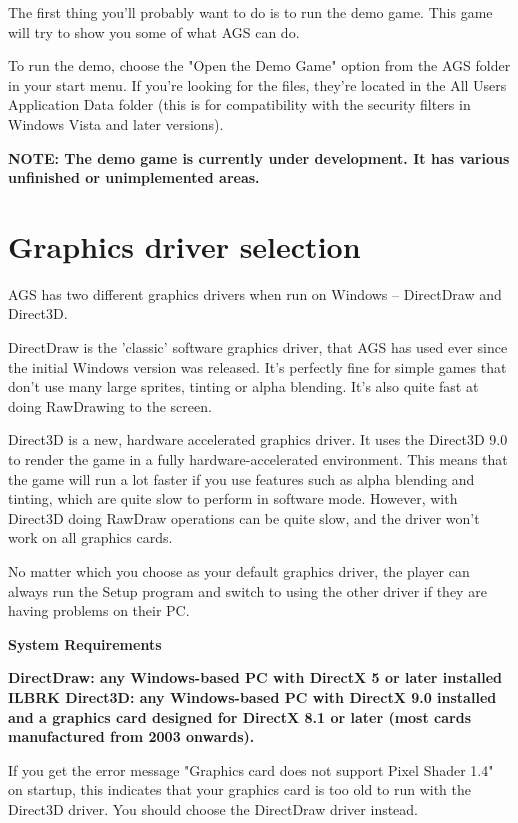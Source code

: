 The first thing you'll probably want to do is to run the demo game. This
game will try to show you some of what AGS can do.

To run the demo, choose the "Open the Demo Game" option from the AGS folder
in your start menu. If you're looking for the files, they're located in the
All Users Application Data folder (this is for compatibility with the security filters in Windows Vista and later versions).

\bf{NOTE:} The demo game is currently under development. It has various unfinished
or unimplemented areas.



\section{Graphics driver selection}\label{GraphicsDriver}%

AGS has two different graphics drivers when run on Windows -- DirectDraw and Direct3D.

DirectDraw is the 'classic' software graphics driver, that AGS has used ever since
the initial Windows version was released. It's perfectly fine for simple games
that don't use many large sprites, tinting or alpha blending. It's also quite fast
at doing RawDrawing to the screen.

Direct3D is a new, hardware accelerated graphics driver. It uses the Direct3D 9.0 to
render the game in a fully hardware-accelerated environment. This means that the
game will run a lot faster if you use features such as alpha blending and tinting,
which are quite slow to perform in software mode. However, with Direct3D doing RawDraw
operations can be quite slow, and the driver won't work on all graphics cards.

No matter which you choose as your default graphics driver, the player can always
run the Setup program and switch to using the other driver if they are having problems
on their PC.

\bf{System Requirements}

\bf{DirectDraw}: any Windows-based PC with DirectX 5 or later installed ILBRK
\bf{Direct3D}: any Windows-based PC with DirectX 9.0 installed and a graphics card designed
for DirectX 8.1 or later (most cards manufactured from 2003 onwards).

If you get the error message "Graphics card does not support Pixel Shader 1.4" on startup,
this indicates that your graphics card is too old to run with the Direct3D driver. You
should choose the DirectDraw driver instead.

